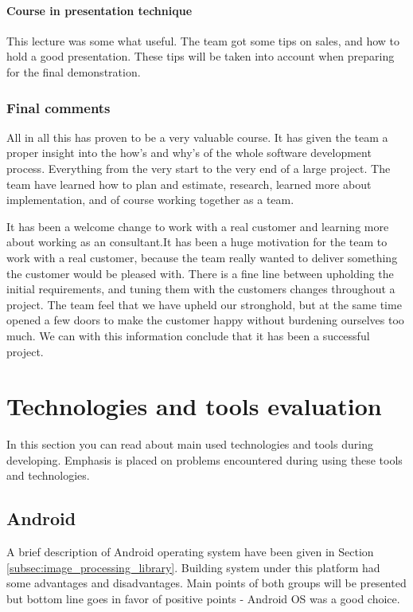 \paragraph{Course in presentation technique}
This lecture was some what useful. The team got some tips on sales, and how to hold a good presentation. These tips will be taken into account when preparing for the final demonstration. 

\subsubsection{Final comments}

All in all this has proven to be a very valuable course. It has given the team a proper insight into the how's and why's of the whole software development process. Everything from the very start to the very end of a large project. The team have learned how to plan and estimate, research, learned more about implementation, and of course working together as a team. 

It has been a welcome change to work with a real customer and learning more about working as an consultant.It has been a huge motivation for the team to work with a real customer, because the team really wanted to deliver something the customer would be pleased with. There is a fine line between upholding the initial requirements, and tuning them with the customers changes throughout a project. The team feel that we have upheld our stronghold, but at the same time opened a few doors to
make the customer happy without burdening ourselves too much. We can with this information
conclude that it has been a successful project.

\section{Technologies and tools evaluation}
In this section you can read about main used technologies and tools during developing.
Emphasis is placed on problems encountered during using these tools and technologies.

\subsection{Android}
A brief description of Android operating system have been given in Section \ref{subsec:image_processing_library}. Building system under this platform had some advantages and disadvantages. Main points of both groups will be presented but bottom line goes in favor of positive points - Android OS was a good choice.

